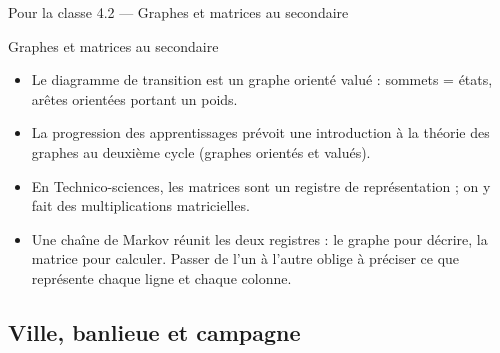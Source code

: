\begin{frame}{Pour la classe 4.2 --- Graphes et matrices au secondaire}
  \begin{Classe}{Graphes et matrices au secondaire}
    \small
    \begin{itemize}
      \item Le diagramme de transition est un graphe orienté valué :
        sommets = états, arêtes orientées portant un poids.
      \item La progression des apprentissages prévoit une introduction à
        la théorie des graphes au deuxième cycle (graphes orientés et
        valués).
      \item En Technico-sciences, les matrices sont un registre de
        représentation ; on y fait des multiplications matricielles.
      \item Une chaîne de Markov réunit les deux registres : le graphe pour
        décrire, la matrice pour calculer. Passer de l'un à l'autre oblige
        à préciser ce que représente chaque ligne et chaque colonne.
    \end{itemize}
  \end{Classe}
\end{frame}

\subsection{Ville, banlieue et campagne}

